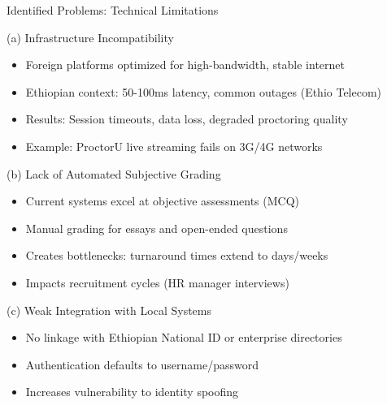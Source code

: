 \begin{frame}{Identified Problems: Technical Limitations}
    \begin{alertblock}{(a) Infrastructure Incompatibility}
        \begin{itemize}
            \item Foreign platforms optimized for high-bandwidth, stable internet
            \item Ethiopian context: 50-100ms latency, common outages (Ethio Telecom)
            \item Results: Session timeouts, data loss, degraded proctoring quality
            \item Example: ProctorU live streaming fails on 3G/4G networks
        \end{itemize}
    \end{alertblock}
    
    \begin{alertblock}{(b) Lack of Automated Subjective Grading}
        \begin{itemize}
            \item Current systems excel at objective assessments (MCQ)
            \item Manual grading for essays and open-ended questions
            \item Creates bottlenecks: turnaround times extend to days/weeks
            \item Impacts recruitment cycles (HR manager interviews)
        \end{itemize}
    \end{alertblock}
    
    \begin{alertblock}{(c) Weak Integration with Local Systems}
        \begin{itemize}
            \item No linkage with Ethiopian National ID or enterprise directories
            \item Authentication defaults to username/password
            \item Increases vulnerability to identity spoofing
        \end{itemize}
    \end{alertblock}
\end{frame}

